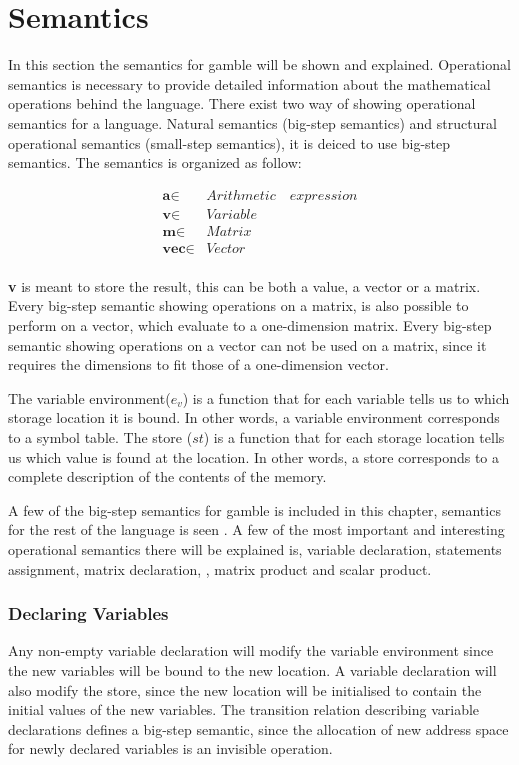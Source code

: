 \chapter{Semantics}
In this section the semantics for \gls{gamble} will be shown and explained.
Operational semantics is necessary to provide detailed information about the mathematical operations behind the language.
There exist two way of showing operational semantics for a language.
Natural semantics (big-step semantics) and structural operational semantics (small-step semantics), it is deiced to use big-step semantics.
The semantics is organized as follow:

\begin{align*}
	\textbf{a} \in  &Arithmetic\quad expression\\
	\textbf{v} \in  &Variable\\
	\textbf{m} \in  &Matrix\\
	\textbf{vec} \in  &Vector\\
\end{align*}

\textbf{v} is meant to store the result, this can be both a value, a vector or a matrix.
Every big-step semantic showing operations on a matrix, is also possible to perform on a vector, which evaluate to a one-dimension matrix.
Every big-step semantic showing operations on a vector can not be used on a matrix, since it requires the dimensions to fit those of a one-dimension vector.

The variable environment(${ e }_{ v }$) is a function that for each variable tells us to which storage location it is bound. In other words, a variable environment corresponds to a symbol table.
The store ($st$) is a function that for each storage location tells us which value is found at the location. In other words, a store corresponds to a complete description of the contents of the memory.\citep{EnvSt_Semantics}

A few of the big-step semantics for \gls{gamble} is included in this chapter, semantics for the rest of the language is seen .
A few of the most important and interesting operational semantics there will be explained is, variable declaration, statements assignment, matrix declaration, , matrix product and scalar product.

\subsection*{Declaring Variables}
Any non-empty variable declaration will modify the variable environment since the new variables will be bound to the new location.
A variable declaration will also modify the store, since the new location will be initialised to contain the initial values of the new variables.
The transition relation describing variable declarations defines a big-step semantic, since the allocation of new address space for newly declared variables is an invisible operation.

